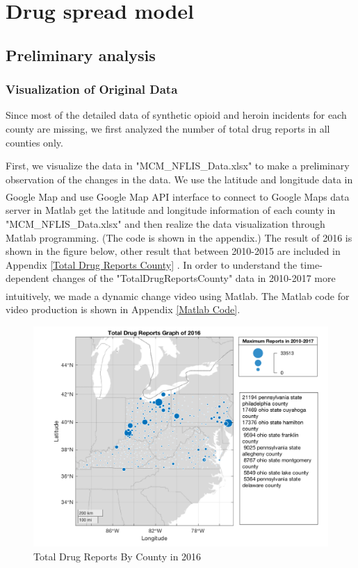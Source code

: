 \documentclass{mcmthesis}
\newcommand{\upcite}[1]{\textsuperscript{\textsuperscript{\cite{#1}}}}
\begin{document}
 



\section{Drug spread model}
\subsection{Preliminary analysis}
\subsubsection{Visualization of Original Data}
Since most of the detailed data of synthetic opioid and heroin incidents for each county are missing, we first analyzed the number of total drug reports in all counties only.

First, we visualize the data in "MCM\_NFLIS\_Data.xlsx" to make a preliminary observation of the changes in the data. We use the latitude and longitude data in Google Map and use Google Map API interface\upcite{svennerberg2010beginning} to connect to Google Maps data server in Matlab get the latitude and longitude information of each county in "MCM\_NFLIS\_Data.xlsx" and then realize the data visualization through Matlab programming. (The code is shown in the appendix.) The result of 2016 is shown in the figure below, other result that between 2010-2015 are included in Appendix  \ref{Total Drug Reports County} . In order to understand the time-dependent changes of the "TotalDrugReportsCounty" data in 2010-2017 more intuitively, we made a dynamic change video using Matlab\upcite{higham2016matlab}. The Matlab code for video production is shown in Appendix \ref{Matlab Code}.


\begin{figure}[H]
  \includegraphics[width=6in]{figures/TotalDrugReportsCounty2016.png}
\caption{Total Drug Reports By County in 2016}
\label{Total Drug Reports County in 2016}
\end{figure}
\end{document}
